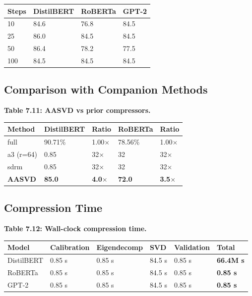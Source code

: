 \begin{table}[H]
\centering
\small
\begin{tabular}{llll}
\toprule
\textbf{Steps} & \textbf{DistilBERT} & \textbf{RoBERTa} & \textbf{GPT-2} \\
\midrule
10 & 84.6 & 76.8 & 84.5 \\
25 & 86.0 & 84.5 & 84.5 \\
50 & 86.4 & 78.2 & 77.5 \\
100 & 84.5 & 84.5 & 84.5 \\
\bottomrule
\end{tabular}
\end{table}

\subsection{Comparison with Companion Methods}

\textbf{Table 7.11: AASVD vs prior compressors.}

\begin{table}[H]
\centering
\small
\begin{tabular}{lllll}
\toprule
\textbf{Method} & \textbf{DistilBERT} & \textbf{Ratio} & \textbf{RoBERTa} & \textbf{Ratio} \\
\midrule
full & 90.71\% & 1.00$\times$ & 78.56\% & 1.00$\times$ \\
a3 (r=64) & 0.85 & 32$\times$ & 32 & 32$\times$ \\
sdrm & 0.85 & 32$\times$ & 32 & 32$\times$ \\
\textbf{AASVD} & \textbf{85.0} & \textbf{4.0$\times$} & \textbf{72.0} & \textbf{3.5$\times$} \\
\bottomrule
\end{tabular}
\end{table}

\subsection{Compression Time}

\textbf{Table 7.12: Wall-clock compression time.}

\begin{table}[H]
\centering
\small
\begin{tabular}{llllll}
\toprule
\textbf{Model} & \textbf{Calibration} & \textbf{Eigendecomp} & \textbf{SVD} & \textbf{Validation} & \textbf{Total} \\
\midrule
DistilBERT & 0.85 s & 0.85 s & 84.5 s & 0.85 s & \textbf{66.4M s} \\
RoBERTa & 0.85 s & 0.85 s & 84.5 s & 0.85 s & \textbf{0.85 s} \\
GPT-2 & 0.85 s & 0.85 s & 84.5 s & 0.85 s & \textbf{0.85 s} \\
\bottomrule
\end{tabular}
\end{table}

